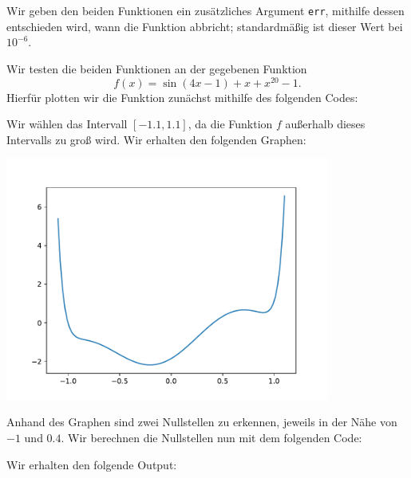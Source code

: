 \section{}

Wir geben den beiden Funktionen ein zusätzliches Argument \texttt{err}, mithilfe dessen entschieden wird, wann die Funktion abbricht; standardmäßig ist dieser Wert bei $10^{-6}$.



Wir testen die beiden Funktionen an der gegebenen Funktion
\[
    f(x)
  = \sin(4x - 1) + x + x^{20} - 1.
\]
Hierfür plotten wir die Funktion zunächst mithilfe des folgenden Codes:



Wir wählen das Intervall $[-1.1, 1.1]$, da die Funktion $f$ außerhalb dieses Intervalls zu groß wird.
Wir erhalten den folgenden Graphen:

\begin{center}
  \includegraphics[width = 0.8\textwidth]{chapter_04/exercise_04_13_figure.pdf}
\end{center}

Anhand des Graphen sind zwei Nullstellen zu erkennen, jeweils in der Nähe von $-1$ und $0.4$.
Wir berechnen die Nullstellen nun mit dem folgenden Code:
  


Wir erhalten den folgende Output:

